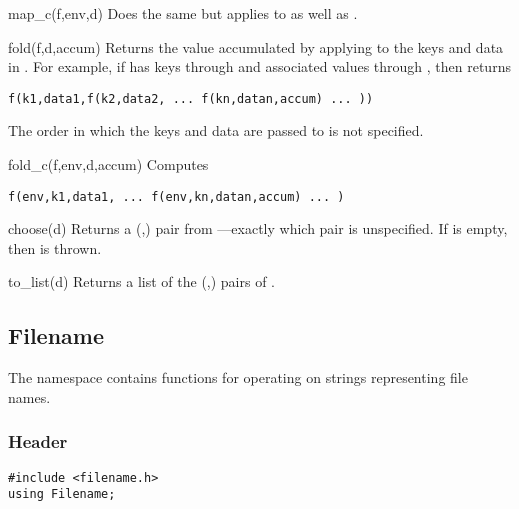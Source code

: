 \begin{defun}{map_c}{(f,env,d)}
Does the same but applies  to  as well as .
\end{defun}


\begin{defun}{fold}{(f,d,accum)}
Returns the value accumulated by applying  to the keys and data
in .  For example, if  has keys  through 
and associated values  through , then 
returns

\begin{verbatim}
f(k1,data1,f(k2,data2, ... f(kn,datan,accum) ... ))
\end{verbatim}

\noindent The order in which the keys and data are passed to  is
not specified.
\end{defun}

\begin{defun}{fold_c}{(f,env,d,accum)}
Computes

\begin{verbatim}
f(env,k1,data1, ... f(env,kn,datan,accum) ... )
\end{verbatim}
\end{defun}

\begin{defun}{choose}{(d)}
Returns a (,) pair from ---exactly which pair
is unspecified.  If  is empty, then  is thrown.
\end{defun}

\begin{defun}{to_list}{(d)}
Returns a list of the (,) pairs of .
\end{defun}

\subsection{Filename}

The  namespace contains functions for operating on
strings representing file names.

\subsubsection*{Header}
\begin{verbatim}
#include <filename.h>
using Filename;
\end{verbatim}

